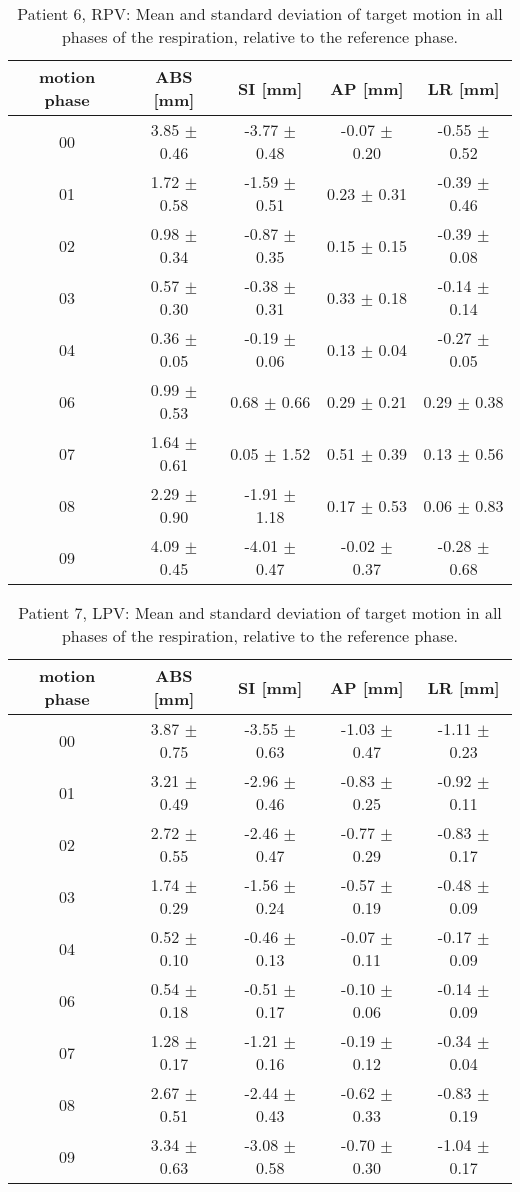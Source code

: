 \begin{table}[H]
  \centering
  \caption{Patient 6, RPV: Mean and standard deviation of target motion in all phases of the respiration, relative to the reference phase.}
  \begin{tabular}{|c|c|c|c|c|}
    \hline\hline
    motion phase & ABS [mm] & SI [mm] & AP [mm] & LR [mm]\\
    \hline 
00& 3.85 $\pm$ 0.46& -3.77 $\pm$ 0.48& -0.07 $\pm$ 0.20& -0.55 $\pm$ 0.52 \\
01& 1.72 $\pm$ 0.58& -1.59 $\pm$ 0.51& 0.23 $\pm$ 0.31& -0.39 $\pm$ 0.46 \\
02& 0.98 $\pm$ 0.34& -0.87 $\pm$ 0.35& 0.15 $\pm$ 0.15& -0.39 $\pm$ 0.08 \\
03& 0.57 $\pm$ 0.30& -0.38 $\pm$ 0.31& 0.33 $\pm$ 0.18& -0.14 $\pm$ 0.14 \\
04& 0.36 $\pm$ 0.05& -0.19 $\pm$ 0.06& 0.13 $\pm$ 0.04& -0.27 $\pm$ 0.05 \\
06& 0.99 $\pm$ 0.53& 0.68 $\pm$ 0.66& 0.29 $\pm$ 0.21& 0.29 $\pm$ 0.38 \\
07& 1.64 $\pm$ 0.61& 0.05 $\pm$ 1.52& 0.51 $\pm$ 0.39& 0.13 $\pm$ 0.56 \\
08& 2.29 $\pm$ 0.90& -1.91 $\pm$ 1.18& 0.17 $\pm$ 0.53& 0.06 $\pm$ 0.83 \\
09& 4.09 $\pm$ 0.45& -4.01 $\pm$ 0.47& -0.02 $\pm$ 0.37& -0.28 $\pm$ 0.68 \\
        \hline\hline
  \end{tabular}
\end{table}


\begin{table}[H]
  \centering
\caption{Patient 7, LPV: Mean and standard deviation of target motion in all phases of the respiration, relative to the reference phase.}
  \begin{tabular}{|c|c|c|c|c|}
    \hline\hline
    motion phase & ABS [mm] & SI [mm] & AP [mm] & LR [mm]\\
    \hline 
00& 3.87 $\pm$ 0.75& -3.55 $\pm$ 0.63& -1.03 $\pm$ 0.47& -1.11 $\pm$ 0.23 \\
01& 3.21 $\pm$ 0.49& -2.96 $\pm$ 0.46& -0.83 $\pm$ 0.25& -0.92 $\pm$ 0.11 \\
02& 2.72 $\pm$ 0.55& -2.46 $\pm$ 0.47& -0.77 $\pm$ 0.29& -0.83 $\pm$ 0.17 \\
03& 1.74 $\pm$ 0.29& -1.56 $\pm$ 0.24& -0.57 $\pm$ 0.19& -0.48 $\pm$ 0.09 \\
04& 0.52 $\pm$ 0.10& -0.46 $\pm$ 0.13& -0.07 $\pm$ 0.11& -0.17 $\pm$ 0.09 \\
06& 0.54 $\pm$ 0.18& -0.51 $\pm$ 0.17& -0.10 $\pm$ 0.06& -0.14 $\pm$ 0.09 \\
07& 1.28 $\pm$ 0.17& -1.21 $\pm$ 0.16& -0.19 $\pm$ 0.12& -0.34 $\pm$ 0.04 \\
08& 2.67 $\pm$ 0.51& -2.44 $\pm$ 0.43& -0.62 $\pm$ 0.33& -0.83 $\pm$ 0.19 \\
09& 3.34 $\pm$ 0.63& -3.08 $\pm$ 0.58& -0.70 $\pm$ 0.30& -1.04 $\pm$ 0.17 \\
        \hline\hline
  \end{tabular}
\end{table}


